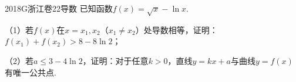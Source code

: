 
\begin{problem}{2018}{G}{浙江卷}{22}{导数}
已知函数$f(x)=\sqrt{x}-\ln x$.

（1）若$f(x)$在$x=x_1,x_2$（$x_1\neq x_2$）处导数相等，证明：$f(x_1)+f(x_2)>8-8\ln2$；

（2）若$a\leq3-4\ln2$，证明：对于任意$k>0$，直线$y=kx+a$与曲线$y=f(x)$有唯一公共点.
\end{problem}